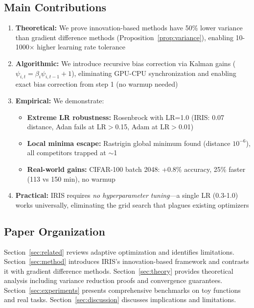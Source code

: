 \subsection{Main Contributions}

\begin{enumerate}
    \item \textbf{Theoretical:} We prove innovation-based methods have 50\% lower variance than gradient difference methods (Proposition~\ref{prop:variance}), enabling 10-1000$\times$ higher learning rate tolerance
    
    \item \textbf{Algorithmic:} We introduce recursive bias correction via Kalman gains ($\psi_{i,t} = \beta_i \psi_{i,t-1} + 1$), eliminating GPU-CPU synchronization and enabling exact bias correction from step 1 (no warmup needed)
    
    \item \textbf{Empirical:} We demonstrate:
    \begin{itemize}
        \item \textbf{Extreme LR robustness:} Rosenbrock with LR=1.0 (IRIS: 0.07 distance, Adan fails at LR$>$0.15, Adam at LR$>$0.01)
        \item \textbf{Local minima escape:} Rastrigin global minimum found (distance $10^{-6}$), all competitors trapped at $\sim$1
        \item \textbf{Real-world gains:} CIFAR-100 batch 2048: +0.8\% accuracy, 25\% faster (113 vs 150 min), no warmup
    \end{itemize}
    
    \item \textbf{Practical:} IRIS requires \emph{no hyperparameter tuning}---a single LR (0.3-1.0) works universally, eliminating the grid search that plagues existing optimizers
\end{enumerate}

\subsection{Paper Organization}

Section~\ref{sec:related} reviews adaptive optimization and identifies limitations. Section~\ref{sec:method} introduces IRIS's innovation-based framework and contrasts it with gradient difference methods. Section~\ref{sec:theory} provides theoretical analysis including variance reduction proofs and convergence guarantees. Section~\ref{sec:experiments} presents comprehensive benchmarks on toy functions and real tasks. Section~\ref{sec:discussion} discusses implications and limitations.
